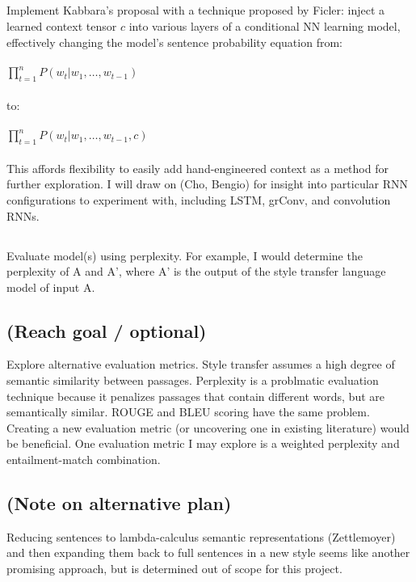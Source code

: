 \documentclass[11pt]{article}
\begin{document}
\subsection{}
Implement Kabbara's proposal with a technique proposed by Ficler: inject a learned context tensor $c$ into various layers of a conditional NN learning model, effectively changing the model's sentence probability equation from:
\\
\\
$\prod_{t=1}^n P(w_t|w_1,\ldots,w_{t-1})$ 
\\
\\
to:
\\
\\
$\prod_{t=1}^n P(w_t|w_1,\ldots,w_{t-1}, c)$ 
\\
\\
This affords flexibility to easily add hand-engineered context as a method for further exploration. I will draw on (Cho, Bengio) for insight into particular RNN configurations to experiment with, including LSTM, grConv, and convolution RNNs.


\subsection{}
Evaluate model(s) using perplexity. For example, I would determine the perplexity of A and A', where A' is the output of the style transfer language model of input A.

\subsection{(Reach goal / optional)}
Explore alternative evaluation metrics. Style transfer assumes a high degree of semantic similarity between passages. Perplexity is a problmatic evaluation technique because it penalizes passages that contain different words, but are semantically similar. ROUGE and BLEU scoring have the same problem. Creating a new evaluation metric (or uncovering one in existing literature) would be beneficial. One evaluation metric I may explore is a weighted perplexity and entailment-match combination.

\subsection{(Note on alternative plan)}
Reducing sentences to lambda-calculus semantic representations (Zettlemoyer) and then expanding them back to full sentences in a new style seems like another promising approach, but is determined out of scope for this project.
\end{document}
